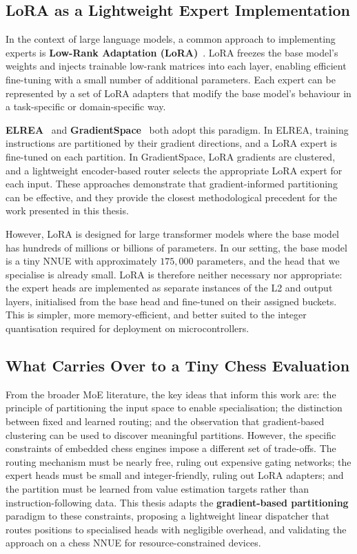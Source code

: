 \subsection{LoRA as a Lightweight Expert Implementation}\label{sec:lora}

In the context of large language models, a common approach to implementing experts is \textbf{Low-Rank Adaptation (LoRA)}~\cite{hu2022lora}. LoRA freezes the base model's weights and injects trainable low-rank matrices into each layer, enabling efficient fine-tuning with a small number of additional parameters. Each expert can be represented by a set of LoRA adapters that modify the base model's behaviour in a task-specific or domain-specific way.

\textbf{ELREA}~\cite{li2025elrea} and \textbf{GradientSpace}~\cite{sridharan2025gradientspace} both adopt this paradigm. In ELREA, training instructions are partitioned by their gradient directions, and a LoRA expert is fine-tuned on each partition. In GradientSpace, LoRA gradients are clustered, and a lightweight encoder-based router selects the appropriate LoRA expert for each input. These approaches demonstrate that gradient-informed partitioning can be effective, and they provide the closest methodological precedent for the work presented in this thesis.

However, LoRA is designed for large transformer models where the base model has hundreds of millions or billions of parameters. In our setting, the base model is a tiny NNUE with approximately \(175{,}000\) parameters, and the head that we specialise is already small. LoRA is therefore neither necessary nor appropriate: the expert heads are implemented as separate instances of the L2 and output layers, initialised from the base head and fine-tuned on their assigned buckets. This is simpler, more memory-efficient, and better suited to the integer quantisation required for deployment on microcontrollers.

\subsection{What Carries Over to a Tiny Chess Evaluation}\label{sec:moe-carryover}

From the broader MoE literature, the key ideas that inform this work are: the principle of partitioning the input space to enable specialisation; the distinction between fixed and learned routing; and the observation that gradient-based clustering can be used to discover meaningful partitions. However, the specific constraints of embedded chess engines impose a different set of trade-offs. The routing mechanism must be nearly free, ruling out expensive gating networks; the expert heads must be small and integer-friendly, ruling out LoRA adapters; and the partition must be learned from value estimation targets rather than instruction-following data. This thesis adapts the \textbf{gradient-based partitioning} paradigm to these constraints, proposing a lightweight linear dispatcher that routes positions to specialised heads with negligible overhead, and validating the approach on a chess NNUE for resource-constrained devices.


